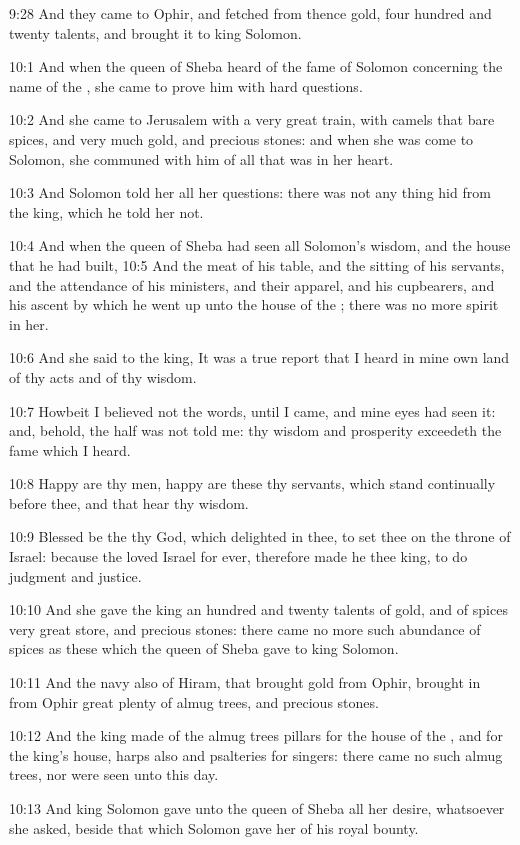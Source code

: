 9:28 And they came to Ophir, and fetched from thence gold, four hundred and twenty talents, and brought it to king Solomon.

10:1 And when the queen of Sheba heard of the fame of Solomon concerning the name of the \LORD, she came to prove him with hard questions.

10:2 And she came to Jerusalem with a very great train, with camels that bare spices, and very much gold, and precious stones: and when she was come to Solomon, she communed with him of all that was in her heart.

10:3 And Solomon told her all her questions: there was not any thing hid from the king, which he told her not.

10:4 And when the queen of Sheba had seen all Solomon's wisdom, and the house that he had built, 10:5 And the meat of his table, and the sitting of his servants, and the attendance of his ministers, and their apparel, and his cupbearers, and his ascent by which he went up unto the house of the \LORD; there was no more spirit in her.

10:6 And she said to the king, It was a true report that I heard in mine own land of thy acts and of thy wisdom.

10:7 Howbeit I believed not the words, until I came, and mine eyes had seen it: and, behold, the half was not told me: thy wisdom and prosperity exceedeth the fame which I heard.

10:8 Happy are thy men, happy are these thy servants, which stand continually before thee, and that hear thy wisdom.

10:9 Blessed be the \LORD thy God, which delighted in thee, to set thee on the throne of Israel: because the \LORD loved Israel for ever, therefore made he thee king, to do judgment and justice.

10:10 And she gave the king an hundred and twenty talents of gold, and of spices very great store, and precious stones: there came no more such abundance of spices as these which the queen of Sheba gave to king Solomon.

10:11 And the navy also of Hiram, that brought gold from Ophir, brought in from Ophir great plenty of almug trees, and precious stones.

10:12 And the king made of the almug trees pillars for the house of the \LORD, and for the king's house, harps also and psalteries for singers: there came no such almug trees, nor were seen unto this day.

10:13 And king Solomon gave unto the queen of Sheba all her desire, whatsoever she asked, beside that which Solomon gave her of his royal bounty.

